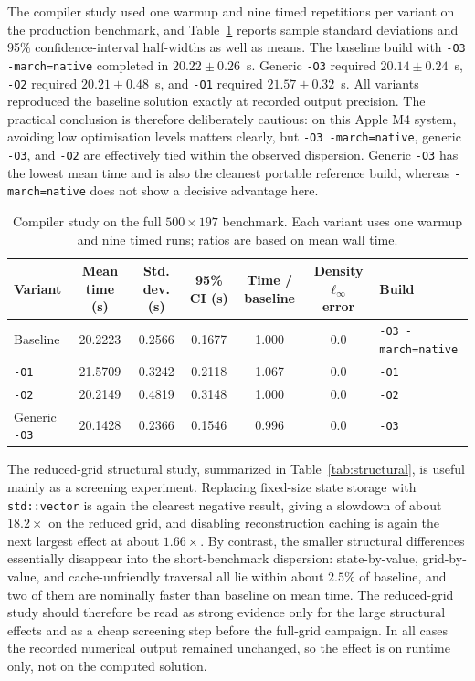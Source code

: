\documentclass[final,3p,times,twocolumn]{elsarticle}
\begin{document}
The compiler study used one warmup and nine timed repetitions per variant on the production benchmark, and Table~\ref{tab:compiler} reports sample standard deviations and 95\% confidence-interval half-widths as well as means. The baseline build with \texttt{-O3 -march=native} completed in $20.22 \pm 0.26$~s. Generic \texttt{-O3} required $20.14 \pm 0.24$~s, \texttt{-O2} required $20.21 \pm 0.48$~s, and \texttt{-O1} required $21.57 \pm 0.32$~s. All variants reproduced the baseline solution exactly at recorded output precision. The practical conclusion is therefore deliberately cautious: on this Apple M4 system, avoiding low optimisation levels matters clearly, but \texttt{-O3 -march=native}, generic \texttt{-O3}, and \texttt{-O2} are effectively tied within the observed dispersion. Generic \texttt{-O3} has the lowest mean time and is also the cleanest portable reference build, whereas \texttt{-march=native} does not show a decisive advantage here.

\begin{table}[t]
\centering
\caption{Compiler study on the full $500 \times 197$ benchmark. Each variant uses one warmup and nine timed runs; ratios are based on mean wall time.}
\label{tab:compiler}
\begin{tabular}{lcccccl}
\toprule
Variant & Mean time (s) & Std. dev. (s) & 95\% CI (s) & Time / baseline & Density $\ell_\infty$ error & Build \\
\midrule
Baseline & 20.2223 & 0.2566 & 0.1677 & 1.000 & 0.0 & \texttt{-O3 -march=native} \\
\texttt{-O1} & 21.5709 & 0.3242 & 0.2118 & 1.067 & 0.0 & \texttt{-O1} \\
\texttt{-O2} & 20.2149 & 0.4819 & 0.3148 & 1.000 & 0.0 & \texttt{-O2} \\
Generic \texttt{-O3} & 20.1428 & 0.2366 & 0.1546 & 0.996 & 0.0 & \texttt{-O3} \\
\bottomrule
\end{tabular}
\end{table}

The reduced-grid structural study, summarized in Table~\ref{tab:structural}, is useful mainly as a screening experiment. Replacing fixed-size state storage with \texttt{std::vector} is again the clearest negative result, giving a slowdown of about $18.2\times$ on the reduced grid, and disabling reconstruction caching is again the next largest effect at about $1.66\times$. By contrast, the smaller structural differences essentially disappear into the short-benchmark dispersion: state-by-value, grid-by-value, and cache-unfriendly traversal all lie within about $2.5\%$ of baseline, and two of them are nominally faster than baseline on mean time. The reduced-grid study should therefore be read as strong evidence only for the large structural effects and as a cheap screening step before the full-grid campaign. In all cases the recorded numerical output remained unchanged, so the effect is on runtime only, not on the computed solution.
\end{document}
